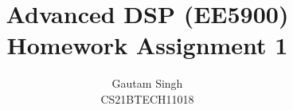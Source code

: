 \documentclass[journal,12pt,twocolumn]{IEEEtran}
\DeclareMathOperator*{\Res}{Res}
\begin{document}
\newtheorem{theorem}{Theorem}[section]
\newtheorem{problem}{Problem}
\newtheorem{proposition}{Proposition}[section]
\newtheorem{lemma}{Lemma}[section]
\newtheorem{corollary}[theorem]{Corollary}
\newtheorem{example}{Example}[section]
\newtheorem{definition}[problem]{Definition}
\newcommand{\BEQA}{\begin{eqnarray}}
\newcommand{\EEQA}{\end{eqnarray}}
\newcommand{\define}{\stackrel{\triangle}{=}}

\providecommand{\mbf}{\mathbf}
\providecommand{\pr}[1]{\ensuremath{\Pr\left(#1\right)}}
\providecommand{\qfunc}[1]{\ensuremath{Q\left(#1\right)}}
\providecommand{\sbrak}[1]{\ensuremath{{}\left[#1\right]}}
\providecommand{\lsbrak}[1]{\ensuremath{{}\left[#1\right.}}
\providecommand{\rsbrak}[1]{\ensuremath{{}\left.#1\right]}}
\providecommand{\brak}[1]{\ensuremath{\left(#1\right)}}
\providecommand{\lbrak}[1]{\ensuremath{\left(#1\right.}}
\providecommand{\rbrak}[1]{\ensuremath{\left.#1\right)}}
\providecommand{\cbrak}[1]{\ensuremath{\left\{#1\right\}}}
\providecommand{\lcbrak}[1]{\ensuremath{\left\{#1\right.}}
\providecommand{\rcbrak}[1]{\ensuremath{\left.#1\right\}}}
\theoremstyle{remark}
\newtheorem{rem}{Remark}
\newcommand{\sgn}{\mathop{\mathrm{sgn}}}
\newcommand{\re}{\mathop{\mathrm{Re}}}
\providecommand{\abs}[1]{\left\vert#1\right\vert}
\providecommand{\res}[1]{\Res\displaylimits_{#1}} 
\providecommand{\norm}[1]{\left\lVert#1\right\rVert}
\providecommand{\mtx}[1]{\mathbf{#1}}
\providecommand{\mean}[1]{E\left[ #1 \right]}   
\providecommand{\fourier}{\overset{\mathcal{F}}{ \rightleftharpoons}}
\providecommand{\system}[1]{\overset{\mathcal{#1}}{ \longleftrightarrow}}
\newcommand{\solution}{\noindent \textbf{Solution: }}
\newcommand{\cosec}{\,\text{cosec}\,}
\providecommand{\dec}[2]{\ensuremath{\overset{#1}{\underset{#2}{\gtrless}}}}
\newcommand{\myvec}[1]{\ensuremath{\begin{pmatrix}#1\end{pmatrix}}}
\newcommand{\mydet}[1]{\ensuremath{\begin{vmatrix}#1\end{vmatrix}}}
\renewcommand{\vec}[1]{\boldsymbol{\mathbf{#1}}}
\def\putbox#1#2#3{\makebox[0in][l]{\makebox[#1][l]{}\raisebox{\baselineskip}[0in][0in]{\raisebox{#2}[0in][0in]{#3}}}}
     \def\rightbox#1{\makebox[0in][r]{#1}}
     \def\centbox#1{\makebox[0in]{#1}}
     \def\topbox#1{\raisebox{-\baselineskip}[0in][0in]{#1}}
     \def\midbox#1{\raisebox{-0.5\baselineskip}[0in][0in]{#1}}

\vspace{3cm}
\title{Advanced DSP (EE5900)\\Homework Assignment 1}
\author{Gautam Singh\\CS21BTECH11018}
\maketitle
\bigskip
\end{document}
